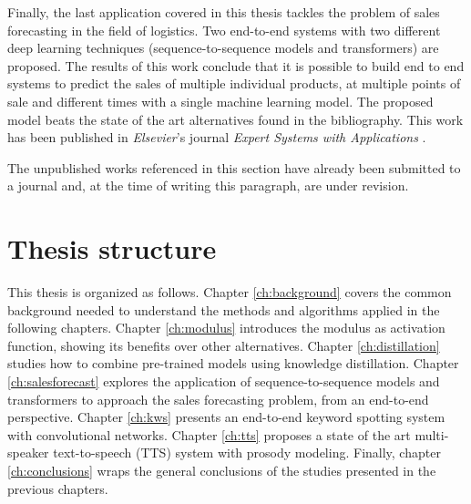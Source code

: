Finally, the last application covered in this thesis tackles the problem of sales forecasting in the field of logistics. Two end-to-end systems with two different deep learning techniques (sequence-to-sequence models and transformers) are proposed. The results of this work conclude that it is possible to build end to end systems to predict the sales of multiple individual products, at multiple points of sale and different times with a single machine learning model. The proposed model beats the state of the art alternatives found in the bibliography. This work has been published in \textit{Elsevier}'s journal \textit{Expert Systems with Applications} \autocite{valles2021c}.

The unpublished works referenced in this section have already been submitted to a journal and, at the time of writing this paragraph, are under revision.

\section{Thesis structure}
This thesis is organized as follows. Chapter \ref{ch:background} covers the common background needed to understand the methods and algorithms applied in the following chapters. Chapter \ref{ch:modulus} introduces the modulus as activation function, showing its benefits over other alternatives. Chapter \ref{ch:distillation} studies how to combine pre-trained models using knowledge distillation. Chapter \ref{ch:salesforecast} explores the application of sequence-to-sequence models and transformers to approach the sales forecasting problem, from an end-to-end perspective. Chapter \ref{ch:kws} presents an end-to-end keyword spotting system with convolutional networks. Chapter \ref{ch:tts} proposes a state of the art multi-speaker text-to-speech (TTS) system with prosody modeling. Finally, chapter \ref{ch:conclusions} wraps the general conclusions of the studies presented in the previous chapters.


